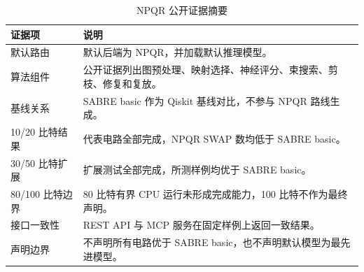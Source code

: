 \begin{table}[H]
  \centering
  \caption{NPQR 公开证据摘要}
  \label{tab:evidence-summary}
  \begin{tabularx}{\linewidth}{lY}
    \toprule
    证据项 & 说明 \\
    \midrule
    默认路由 & 默认后端为 NPQR，并加载默认推理模型。 \\
    算法组件 & 公开证据列出图预处理、映射选择、神经评分、束搜索、剪枝、修复和复放。 \\
    基线关系 & SABRE basic 作为 Qiskit 基线对比，不参与 NPQR 路线生成。 \\
    10/20 比特结果 & 代表电路全部完成，NPQR SWAP 数均低于 SABRE basic。 \\
    30/50 比特扩展 & 扩展测试全部完成，所测样例均优于 SABRE basic。 \\
    80/100 比特边界 & 80 比特有界 CPU 运行未形成完成能力，100 比特不作为最终声明。 \\
    接口一致性 & REST API 与 MCP 服务在固定样例上返回一致结果。 \\
    声明边界 & 不声明所有电路优于 SABRE basic，也不声明默认模型为最先进模型。 \\
    \bottomrule
  \end{tabularx}
\end{table}
